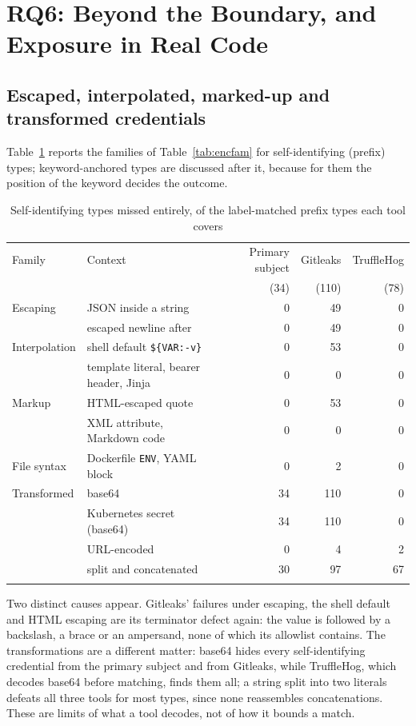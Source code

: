 \documentclass[pdflatex,sn-basic]{sn-jnl}
\begin{document}
\section{RQ6: Beyond the Boundary, and Exposure in Real Code}
\label{sec:rq6}

\subsection{Escaped, interpolated, marked-up and transformed credentials}

Table~\ref{tab:encresults} reports the families of Table~\ref{tab:encfam} for self-identifying (prefix) types; keyword-anchored types are discussed after it, because for them the position of the keyword decides the outcome.

\begin{table}[t]
\centering
\caption{Self-identifying types missed entirely, of the label-matched prefix types each tool covers}
\label{tab:encresults}
\small
\setlength{\tabcolsep}{3pt}
\begin{tabular}{@{}llrrr@{}}
\toprule
Family & Context & Primary subject & Gitleaks & TruffleHog \\
 & & (34) & (110) & (78) \\
\midrule
Escaping & JSON inside a string & 0 & 49 & 0 \\
 & escaped newline after & 0 & 49 & 0 \\
Interpolation & shell default \texttt{\$\{VAR:-v\}} & 0 & 53 & 0 \\
 & template literal, bearer header, Jinja & 0 & 0 & 0 \\
Markup & HTML-escaped quote & 0 & 53 & 0 \\
 & XML attribute, Markdown code & 0 & 0 & 0 \\
File syntax & Dockerfile \texttt{ENV}, YAML block & 0 & 2 & 0 \\
Transformed & base64 & 34 & 110 & 0 \\
 & Kubernetes secret (base64) & 34 & 110 & 0 \\
 & URL-encoded & 0 & 4 & 2 \\
 & split and concatenated & 30 & 97 & 67 \\
\botrule
\end{tabular}
\end{table}

Two distinct causes appear. Gitleaks' failures under escaping, the shell default and HTML escaping are its terminator defect again: the value is followed by a backslash, a brace or an ampersand, none of which its allowlist contains. The transformations are a different matter: base64 hides every self-identifying credential from the primary subject and from Gitleaks, while TruffleHog, which decodes base64 before matching, finds them all; a string split into two literals defeats all three tools for most types, since none reassembles concatenations. These are limits of what a tool decodes, not of how it bounds a match.
\end{document}
